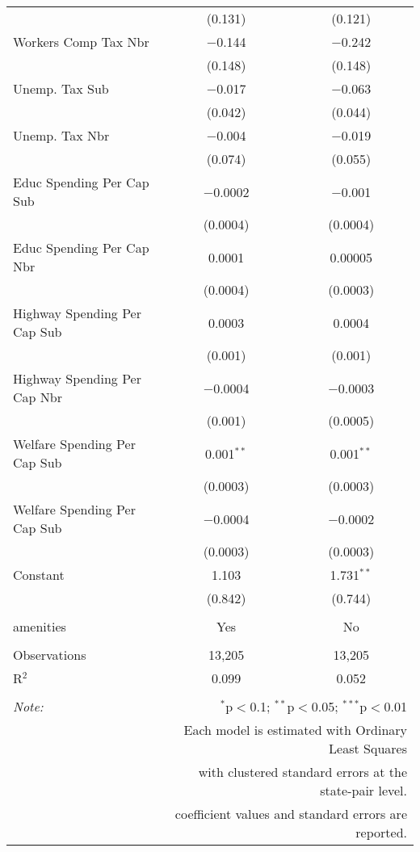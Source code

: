 \begin{table}[!htbp]
\begin{tabular}{@{\extracolsep{5pt}}lcc}
  & (0.131) & (0.121) \\ 
  Workers Comp Tax Nbr & $-$0.144 & $-$0.242 \\ 
  & (0.148) & (0.148) \\ 
  Unemp. Tax Sub & $-$0.017 & $-$0.063 \\ 
  & (0.042) & (0.044) \\ 
  Unemp. Tax Nbr & $-$0.004 & $-$0.019 \\ 
  & (0.074) & (0.055) \\ 
  Educ Spending Per Cap Sub & $-$0.0002 & $-$0.001 \\ 
  & (0.0004) & (0.0004) \\ 
  Educ Spending Per Cap Nbr & 0.0001 & 0.00005 \\ 
  & (0.0004) & (0.0003) \\ 
  Highway Spending Per Cap Sub & 0.0003 & 0.0004 \\ 
  & (0.001) & (0.001) \\ 
  Highway Spending Per Cap Nbr & $-$0.0004 & $-$0.0003 \\ 
  & (0.001) & (0.0005) \\ 
  Welfare Spending Per Cap Sub & 0.001$^{**}$ & 0.001$^{**}$ \\ 
  & (0.0003) & (0.0003) \\ 
  Welfare Spending Per Cap Sub & $-$0.0004 & $-$0.0002 \\ 
  & (0.0003) & (0.0003) \\ 
  Constant & 1.103 & 1.731$^{**}$ \\ 
  & (0.842) & (0.744) \\ 
 \hline \\[-1.8ex] 
amenities & Yes & No \\ 
\hline \\[-1.8ex] 
Observations & 13,205 & 13,205 \\ 
R$^{2}$ & 0.099 & 0.052 \\ 
\hline 
\hline \\[-1.8ex] 
\textit{Note:}  & \multicolumn{2}{r}{$^{*}$p$<$0.1; $^{**}$p$<$0.05; $^{***}$p$<$0.01} \\ 
 & \multicolumn{2}{r}{Each model is estimated with Ordinary Least Squares} \\ 
 & \multicolumn{2}{r}{with clustered standard errors at the state-pair level.} \\ 
 & \multicolumn{2}{r}{coefficient values and standard errors are reported.} \\ 
\end{tabular} 
\end{table} 
